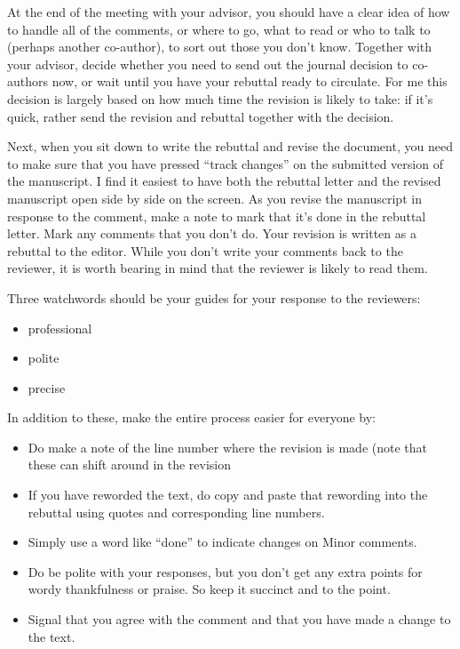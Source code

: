\documentclass[
]{krantz}
\providecommand{\tightlist}{%
  \setlength{\itemsep}{0pt}\setlength{\parskip}{0pt}}
\begin{document}
At the end of the meeting with your advisor, you should have a clear idea of how to handle all of the comments, or where to go, what to read or who to talk to (perhaps another co-author), to sort out those you don't know. Together with your advisor, decide whether you need to send out the journal decision to co-authors now, or wait until you have your rebuttal ready to circulate. For me this decision is largely based on how much time the revision is likely to take: if it's quick, rather send the revision and rebuttal together with the decision.

Next, when you sit down to write the rebuttal and revise the document, you need to make sure that you have pressed ``track changes'' on the submitted version of the manuscript. I find it easiest to have both the rebuttal letter and the revised manuscript open side by side on the screen. As you revise the manuscript in response to the comment, make a note to mark that it's done in the rebuttal letter. Mark any comments that you don't do. Your revision is written as a rebuttal to the editor. While you don't write your comments back to the reviewer, it is worth bearing in mind that the reviewer is likely to read them.

Three watchwords should be your guides for your response to the reviewers:

\begin{itemize}
\tightlist
\item
  professional
\item
  polite
\item
  precise
\end{itemize}

In addition to these, make the entire process easier for everyone by:

\begin{itemize}
\tightlist
\item
  Do make a note of the line number where the revision is made (note that these can shift around in the revision
\item
  If you have reworded the text, do copy and paste that rewording into the rebuttal using quotes and corresponding line numbers.
\item
  Simply use a word like ``done'' to indicate changes on Minor comments.
\item
  Do be polite with your responses, but you don't get any extra points for wordy thankfulness or praise. So keep it succinct and to the point.
\item
  Signal that you agree with the comment and that you have made a change to the text.
\end{itemize}
\end{document}
